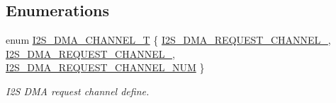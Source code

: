 \subsection*{Enumerations}
\begin{DoxyCompactItemize}
\item 
enum \hyperlink{group__I2S__17XX__40XX_gac04c1583101ddd661886d9677683421b}{I2\-S\-\_\-\-D\-M\-A\-\_\-\-C\-H\-A\-N\-N\-E\-L\-\_\-\-T} \{ \hyperlink{group__I2S__17XX__40XX_ggac04c1583101ddd661886d9677683421ba549b2d28b5da72f6185d736f5fed51c1}{I2\-S\-\_\-\-D\-M\-A\-\_\-\-R\-E\-Q\-U\-E\-S\-T\-\_\-\-C\-H\-A\-N\-N\-E\-L\-\_}, 
\hyperlink{group__I2S__17XX__40XX_ggac04c1583101ddd661886d9677683421ba65eabb50f670f1dcae7b3c790f088e16}{I2\-S\-\_\-\-D\-M\-A\-\_\-\-R\-E\-Q\-U\-E\-S\-T\-\_\-\-C\-H\-A\-N\-N\-E\-L\-\_}, 
\hyperlink{group__I2S__17XX__40XX_ggac04c1583101ddd661886d9677683421bab9921186ab93fee889b2074d508b88ce}{I2\-S\-\_\-\-D\-M\-A\-\_\-\-R\-E\-Q\-U\-E\-S\-T\-\_\-\-C\-H\-A\-N\-N\-E\-L\-\_\-\-N\-U\-M}
 \}
\begin{DoxyCompactList}\small\item\em I2\-S D\-M\-A request channel define. \end{DoxyCompactList}\end{DoxyCompactItemize}
